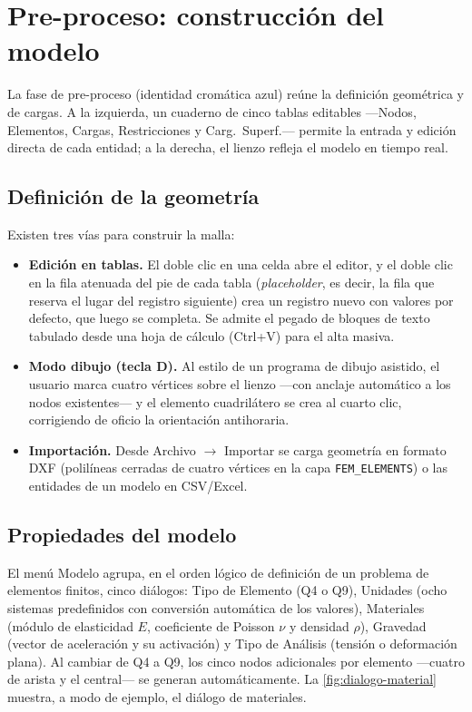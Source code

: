 \section{Pre-proceso: construcción del modelo}

La fase de pre-proceso (identidad cromática azul) reúne la definición geométrica y de cargas. A la izquierda, un cuaderno de cinco tablas editables ---\textsf{Nodos}, \textsf{Elementos}, \textsf{Cargas}, \textsf{Restricciones} y \textsf{Carg.\ Superf.}--- permite la entrada y edición directa de cada entidad; a la derecha, el lienzo refleja el modelo en tiempo real.

\subsection{Definición de la geometría}

Existen tres vías para construir la malla:

\begin{itemize}
  \item \textbf{Edición en tablas.} El doble clic en una celda abre el editor, y el doble clic en la fila atenuada del pie de cada tabla (\emph{placeholder}, es decir, la fila que reserva el lugar del registro siguiente) crea un registro nuevo con valores por defecto, que luego se completa. Se admite el pegado de bloques de texto tabulado desde una hoja de cálculo (Ctrl+V) para el alta masiva.
  \item \textbf{Modo dibujo (tecla D).} Al estilo de un programa de dibujo asistido, el usuario marca cuatro vértices sobre el lienzo ---con anclaje automático a los nodos existentes--- y el elemento cuadrilátero se crea al cuarto clic, corrigiendo de oficio la orientación antihoraria.
  \item \textbf{Importación.} Desde \textsf{Archivo} $\rightarrow$ \textsf{Importar} se carga geometría en formato DXF (polilíneas cerradas de cuatro vértices en la capa \texttt{FEM\_ELEMENTS}) o las entidades de un modelo en CSV/Excel.
\end{itemize}

\subsection{Propiedades del modelo}

El menú \textsf{Modelo} agrupa, en el orden lógico de definición de un problema de elementos finitos, cinco diálogos: \textsf{Tipo de Elemento} (Q4 o Q9), \textsf{Unidades} (ocho sistemas predefinidos con conversión automática de los valores), \textsf{Materiales} (módulo de elasticidad $E$, coeficiente de Poisson $\nu$ y densidad $\rho$), \textsf{Gravedad} (vector de aceleración y su activación) y \textsf{Tipo de Análisis} (tensión o deformación plana). Al cambiar de Q4 a Q9, los cinco nodos adicionales por elemento ---cuatro de arista y el central--- se generan automáticamente. La \autoref{fig:dialogo-material} muestra, a modo de ejemplo, el diálogo de materiales.

